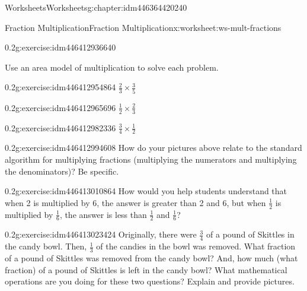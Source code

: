 \documentclass[twoside,11pt,]{book}
\begin{document}
\begin{chapterptx}{Worksheets}{}{Worksheets}{}{}{g:chapter:idm446364420240}
\begin{worksheet-section-numberless}{Fraction Multiplication}{}{Fraction Multiplication}{}{}{x:worksheet:ws-mult-fractions}
\begin{divisionexercise}{6}{}{0.2}{g:exercise:idm446412936640}
\end{divisionexercise}%
\begin{introduction}{}%
Use an area model of multiplication to solve each problem.%
\end{introduction}%
\begin{divisionexercise}{7}{}{0.2}{g:exercise:idm446412954864}%
\(\frac{2}{3} \times \frac{3}{5} \)%
\end{divisionexercise}%
\begin{divisionexercise}{8}{}{0.2}{g:exercise:idm446412965696}%
\(\frac{1}{2} \times \frac{2}{3} \)%
\end{divisionexercise}%
\clearpage
\begin{divisionexercise}{9}{}{0.2}{g:exercise:idm446412982336}%
\(\frac{3}{4} \times \frac{1}{2} \)%
\end{divisionexercise}%
\begin{divisionexercise}{10}{}{0.2}{g:exercise:idm446412994608}%
How do your pictures above relate to the standard algorithm for multiplying fractions (multiplying the numerators and multiplying the denominators)? Be specific.%
\end{divisionexercise}%
\begin{divisionexercise}{11}{}{0.2}{g:exercise:idm446413010864}%
How would you help students understand that when 2 is multiplied by 6, the answer is greater than 2 and 6, but when \(\frac{1}{2} \) is multiplied by \(\frac{1}{6} \), the answer is less than \(\frac{1}{2} \) and \(\frac{1}{6} \)?%
\end{divisionexercise}%
\begin{divisionexercise}{12}{}{0.2}{g:exercise:idm446413023424}%
Originally, there were \(\frac{3}{4} \) of a pound of Skittles in the candy bowl. Then, \(\frac{1}{3} \) of the candies in the bowl was removed. What fraction of a pound of Skittles was removed from the candy bowl? And, how much (what fraction) of a pound of Skittles is left in the candy bowl? What mathematical operations are you doing for these two questions? Explain and provide pictures.%
\end{divisionexercise}%
\end{worksheet-section-numberless}
\restoregeometry
\end{chapterptx}
\end{document}
